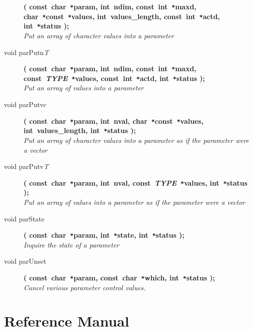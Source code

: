 \documentclass[twoside,11pt,nolof]{starlink}
\begin{document}
\begin{flushleft}
\begin{description}
\textbf{( const~char~\texttt{*}param, int~ndim, const~int~\texttt{*}maxd,
               char~\texttt{*}const~\texttt{*}values, int~values\_length,
               const~int~\texttt{*}actd, int~\texttt{*}status );} \\
\textit{Put an array of character values into a parameter}
\item[void parPutn\textit{T}]
\textbf{( const~char~\texttt{*}param, int~ndim, const~int~\texttt{*}maxd,
               const~\textit{TYPE}~\texttt{*}values, const~int~\texttt{*}actd,
               int~\texttt{*}status );} \\
\textit{Put an array of values into a parameter}
\item[void parPutvc]
\textbf{( const~char~\texttt{*}param, int~nval,
               char~\texttt{*}const~\texttt{*}values, int~values\_length,
               int~\texttt{*}status );} \\
\textit{Put an array of character values into a parameter as if the parameter
            were a vector}
\item[void parPutv\textit{T}]
\textbf{( const~char~\texttt{*}param, int~nval,
          const~\textit{TYPE}~\texttt{*}values, int~\texttt{*}status );}\\
\textit{Put an array of values into a parameter as if the parameter were a
            vector}
\item[void parState]
\textbf{( const~char~\texttt{*}param, int~\texttt{*}state,
          int~\texttt{*}status );}\\
\textit{Inquire the state of a parameter}
\item[void parUnset]
\textbf{( const~char~\texttt{*}param, const~char~\texttt{*}which,
          int~\texttt{*}status );}\\
\textit{Cancel various parameter control values.}
\end{description}
\end{flushleft}

\newpage
\section{Reference Manual}
\label{ap:ref}

\end{document}
